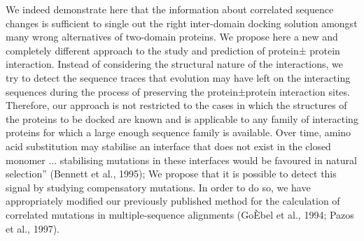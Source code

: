 We indeed demonstrate here that the information about correlated sequence changes is sufficient to single out the right inter-domain docking solution amongst many wrong alternatives of two-domain proteins. \cite{pazos1997correlated}
We propose here a new and completely different approach to the study and prediction of protein± protein interaction. Instead of considering the structural nature of the interactions, we try to detect the sequence traces that evolution may have left on the interacting sequences during the process of preserving the protein±protein interaction sites. \cite{pazos1997correlated}
Therefore, our approach is not restricted to the cases in which the structures of the proteins to be docked are known and is applicable to any family of interacting proteins for which a large enough sequence family is available. \cite{pazos1997correlated}
Over time, amino acid substitution may stabilise an interface that does not exist in the closed monomer ... stabilising mutations in these interfaces would be favoured in natural selection'' (Bennett et al., 1995); \cite{pazos1997correlated}
We propose that it is possible to detect this signal by studying compensatory mutations. In order to do so, we have appropriately modified our previously published method for the calculation of correlated mutations in multiple-sequence alignments (GoÈbel et al., 1994; Pazos et al., 1997). \cite{pazos1997correlated}






